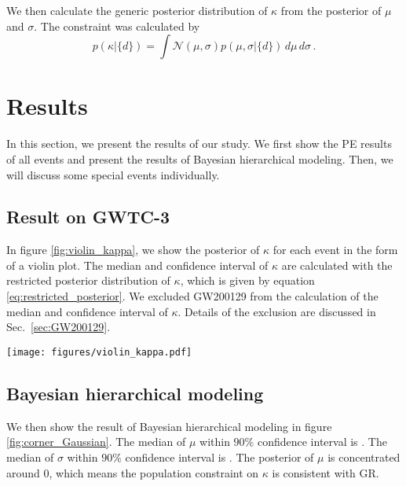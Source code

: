\documentclass[aps,prd,twocolumn,superscriptaddress,preprintnumbers,floatfix,nofootinbib]{revtex4-2}
\begin{document}
We then calculate the generic posterior distribution of $\kappa$ from the posterior of $\mu$ and $\sigma$.
The constraint was calculated by
\begin{equation}
    p(\kappa|\{d\})=\int \mathcal{N}(\mu,\sigma)p(\mu,\sigma|\{d\})\,d\mu\,d\sigma\,.
    \label{eq:generic_posterior}
\end{equation}

\section{Results}
\label{sec:Results}
In this section, we present the results of our study.
We first show the PE results of all events and present the results of Bayesian hierarchical modeling.
Then, we will discuss some special events individually.

\subsection{Result on GWTC-3}
In figure \ref{fig:violin_kappa}, we show the posterior of $\kappa$ for each event in the form of a violin plot.
The median and confidence interval of $\kappa$ are calculated with the restricted posterior distribution of $\kappa$, which is given by equation \ref{eq:restricted_posterior}.
We excluded GW200129 from the calculation of the median and confidence interval of $\kappa$.
Details of the exclusion are discussed in Sec.~\ref{sec:GW200129}.

\begin{figure*}[ht]
    \texttt{[image: figures/violin\_kappa.pdf]}
    \caption{
        The violin plot shows the posterior of $\kappa$ for 69 events in this study.
        Each violin represents a different event.
        The color of the violins represents the quotient of the median and standard deviation of the posterior.
        The blue horizontal solid line represents the median of the restricted posterior of $\kappa$, and the blue dashed lines enclose the $90\%$ confidence interval of the restricted posterior of $\kappa$.
        The pink horizontal solid line represents $\kappa=0$.
    }
    \label{fig:violin_kappa}
\end{figure*}

\subsection{Bayesian hierarchical modeling}
We then show the result of Bayesian hierarchical modeling in figure \ref{fig:corner_Gaussian}.
The median of $\mu$ within $90\%$ confidence interval is .
The median of $\sigma$ within $90\%$ confidence interval is .
The posterior of $\mu$ is concentrated around $0$, which means the population constraint on $\kappa$ is consistent with GR.
\end{document}
